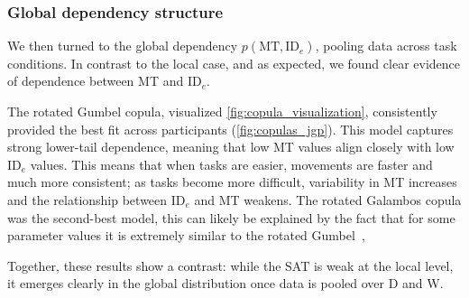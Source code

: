 \documentclass[acmlarge, manuscript,review]{acmart}
\newcommand{\mt}{\ensuremath{{\text{MT}}}\xspace}
\newcommand{\ide}{\ensuremath{{\text{ID}_e}}\xspace}
\begin{document}
\subsubsection{Global dependency structure}
We then turned to the global dependency $p(\mt, \ide)$, pooling data across task conditions. In contrast to the local case, and as expected, we found clear evidence of dependence between MT and \ide. 

The rotated Gumbel copula, visualized \autoref{fig:copula_visualization}, consistently provided the best fit across participants (\autoref{fig:copulas_jgp}). This model captures strong lower-tail dependence, meaning that low MT values align closely with low \ide values. This means that when tasks are easier, movements are faster and much more consistent; as tasks become more difficult, variability in MT increases and the relationship between \ide and MT weakens. The rotated Galambos copula was the second-best model, this can likely be explained by the fact that for some parameter values it is extremely similar to the rotated Gumbel~\cite{genest2017},

Together, these results show a contrast: while the SAT is weak at the local level, it emerges clearly in the global distribution once data is pooled over D and W.





\end{document}
